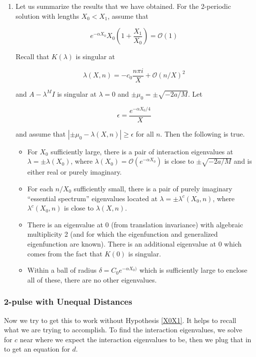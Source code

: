 \documentclass[12pt]{article}
\begin{document}
\begin{enumerate}
\item Let us summarize the results that we have obtained. For the 2-periodic solution with lengths $X_0 < X_1$, assume that

\[
e^{-\alpha X_0}X_0\left( 1 + \frac{X_1}{X_0} \right) = \mathcal{O}(1)
\]

Recall that $K(\lambda)$ is singular at

\[
\lambda(X, n) = -c_0 \frac{n \pi i}{X} + \mathcal{O}(n/X)^2
\]

and $A - \lambda^M I$ is singular at $\lambda = 0$ and $\pm \mu_0 = \pm \sqrt{-2a/M}$. Let 

\[
\epsilon = \frac{e^{-\alpha X_0/4}}{X}
\]

and assume that $| \pm\mu_0 - \lambda(X, n)| \geq \epsilon$ for all $n$. Then the following is true.

\begin{itemize}
	\item For $X_0$ sufficiently large, there is a pair of interaction eigenvalues at $\lambda = \pm \lambda(X_0)$, where $\lambda(X_0) = \mathcal{O}(e^{-\alpha X_0})$ is close to $\pm \sqrt{-2a/M}$ and is either real or purely imaginary.
	\item For each $n/X_0$ sufficiently small, there is a pair of purely imaginary ``essential spectrum'' eigenvalues located at $\lambda = \pm \lambda^c(X_0, n)$, where $\lambda^c(X_0, n)$ is close to $\lambda(X, n)$.
	\item There is an eigenvalue at 0 (from translation invariance) with algebraic multiplicity 2 (and for which the eigenfunction and generalized eigenfunction are known). There is an additional eigenvalue at 0 which comes from the fact that $K(0)$ is singular.
	\item Within a ball of radius $\delta = C_0 e^{-\alpha X_0)}$ which is sufficiently large to enclose all of these, there are no other eigenvalues.
\end{itemize}


\end{enumerate}

\subsubsection{2-pulse with Unequal Distances}

Now we try to get this to work without Hypothesis \ref{X0X1}. It helps to recall what we are trying to accomplish. To find the interaction eigenvalues, we solve for $c$ near where we expect the interaction eigenvalues to be, then we plug that in to get an equation for $d$.\\
\end{document}

